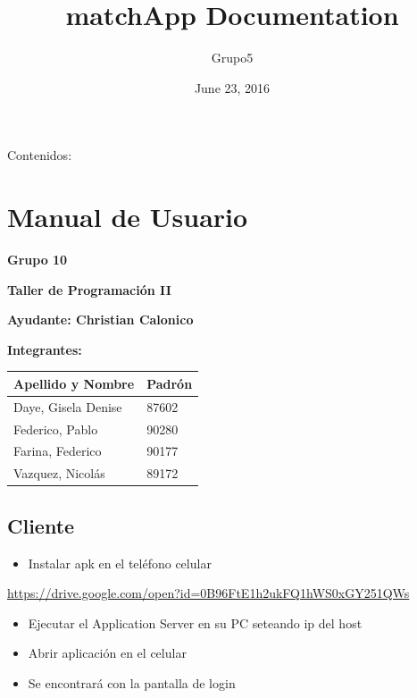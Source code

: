 \documentclass[letterpaper,10pt,english]{sphinxmanual}
\title{matchApp Documentation}
\date{June 23, 2016}
\author{Grupo5}
\begin{document}
\maketitle
\tableofcontents
{}\label{index::doc}


Contenidos:


\chapter{Manual de Usuario}
\label{manuals:manual-de-usuario}\label{manuals::doc}\label{manuals:documentacion-de-matchapp}
\textbf{Grupo 10}

\textbf{Taller de Programación II}

\textbf{Ayudante: Christian Calonico}

\textbf{Integrantes:}

\begin{tabulary}{\linewidth}{|L|L|}
\hline
\textsf{\relax 
Apellido y Nombre
} & \textsf{\relax 
Padrón
}\\
\hline
Daye, Gisela Denise
 & 
87602
\\
\hline
Federico, Pablo
 & 
90280
\\
\hline
Farina, Federico
 & 
90177
\\
\hline
Vazquez, Nicolás
 & 
89172
\\
\hline\end{tabulary}



\section{Cliente}
\label{manuals:cliente}\begin{itemize}
\item {} 
Instalar apk en el teléfono celular

\end{itemize}

\href{https://drive.google.com/open?id=0B96FtE1h2ukFQ1hWS0xGY251QWs}{https://drive.google.com/open?id=0B96FtE1h2ukFQ1hWS0xGY251QWs}
\begin{itemize}
\item {} 
Ejecutar el Application Server en su PC seteando ip del host

\item {} 
Abrir aplicación en el celular

\item {} 
Se encontrará con la pantalla de login

\end{itemize}
\end{document}
